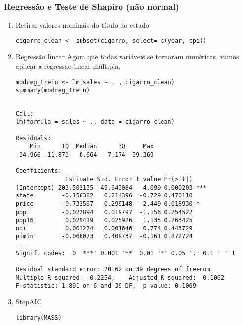 \documentclass[11pt]{article}
\begin{document}
\subsubsection{Regressão e Teste de Shapiro (não normal)}
\label{sec:org7224231}
\begin{enumerate}
\item Retirar valores nominais do título do estado
\label{sec:org9567223}
\begin{verbatim}
cigarro_clean <- subset(cigarro, select=-c(year, cpi))
\end{verbatim}

\item Regressão linear
\label{sec:orgc9b13a3}
Agora que todas variáveis se tornaram numéricas, vamos aplicar a regressão linear múltipla,

\begin{verbatim}
modreg_trein <- lm(sales ~ . , cigarro_clean)
summary(modreg_trein)
\end{verbatim}

\begin{verbatim}

Call:
lm(formula = sales ~ ., data = cigarro_clean)

Residuals:
    Min      1Q  Median      3Q     Max 
-34.966 -11.873   0.664   7.174  59.369 

Coefficients:
              Estimate Std. Error t value Pr(>|t|)    
(Intercept) 203.502135  49.643084   4.099 0.000203 ***
state        -0.156382   0.214396  -0.729 0.470110    
price        -0.732567   0.299148  -2.449 0.018930 *  
pop          -0.022894   0.019797  -1.156 0.254522    
pop16         0.029419   0.025926   1.135 0.263425    
ndi           0.001274   0.001646   0.774 0.443729    
pimin        -0.066073   0.409737  -0.161 0.872724    
---
Signif. codes:  0 '***' 0.001 '**' 0.01 '*' 0.05 '.' 0.1 ' ' 1

Residual standard error: 20.62 on 39 degrees of freedom
Multiple R-squared:  0.2254,	Adjusted R-squared:  0.1062 
F-statistic: 1.891 on 6 and 39 DF,  p-value: 0.1069

\end{verbatim}

\item StepAIC
\label{sec:orgba9eac6}
\begin{verbatim}
library(MASS)
\end{verbatim}


\end{enumerate}
\end{document}

